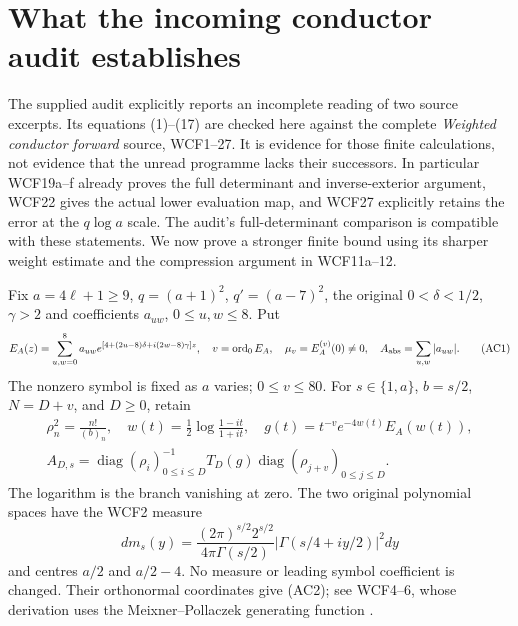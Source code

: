 \section{What the incoming conductor audit establishes}
\label{sec:audit}
The supplied audit explicitly reports an incomplete reading of two source
excerpts. Its equations (1)--(17) are checked here against the complete
\emph{Weighted conductor forward} source, WCF1--27. It is evidence for
those finite calculations, not evidence that the unread programme lacks
their successors. In particular WCF19a--f already proves the full
determinant and inverse-exterior argument, WCF22 gives the actual lower
evaluation map, and WCF27 explicitly retains the error at the
$q\log a$ scale. The audit's full-determinant comparison is compatible
with these statements. We now prove a stronger finite bound using its
sharper weight estimate and the compression argument in WCF11a--12.

Fix $a=4\ell+1\ge9$, $q=(a+1)^2$, $q'=(a-7)^2$, the original
$0<\delta<1/2$, $\gamma>2$ and coefficients $a_{uw}$, $0\le u,w\le8$.
Put
\[
 E_A(z)=\sum_{u,w=0}^8 a_{uw}e^{[4+(2u-8)\delta+i(2w-8)\gamma]z},
 \quad v=\operatorname{ord}_0E_A,\quad \mu_v=E_A^{(v)}(0)\ne0,
 \quad A_{\rm abs}=\sum_{u,w}|a_{uw}|. \tag{AC1}
\]
The nonzero symbol is fixed as $a$ varies; $0\le v\le80$.
For $s\in\{1,a\}$, $b=s/2$, $N=D+v$, and $D\ge0$, retain
\[
 \begin{gathered}
 \rho_n^2=\frac{n!}{(b)_n},\quad
 w(t)=\tfrac12\log\frac{1-it}{1+it},\quad
 g(t)=t^{-v}e^{-4w(t)}E_A(w(t)),\\
 A_{D,s}=\operatorname{diag}(\rho_i)_{0\le i\le D}^{-1}
 T_D(g)\operatorname{diag}(\rho_{j+v})_{0\le j\le D}.
 \end{gathered}\tag{AC2}
\]
The logarithm is the branch vanishing at zero. The two original
polynomial spaces have the WCF2 measure
\[
 dm_s(y)=\frac{(2\pi)^{s/2}2^{s/2}}{4\pi\Gamma(s/2)}
 |\Gamma(s/4+iy/2)|^2dy
\]
and centres $a/2$ and $a/2-4$. No measure or leading symbol coefficient
is changed. Their orthonormal coordinates give (AC2); see WCF4--6,
whose derivation uses the Meixner--Pollaczek generating function
\cite[18.23.7]{DLMF18}.

